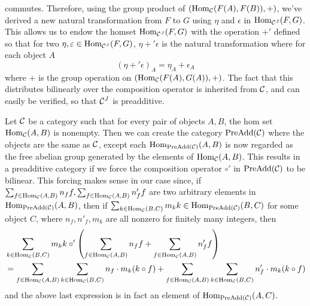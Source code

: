 \begin{example}
\begin{center}
    \end{center}
    commutes. Therefore, using the group product of $(\operatorname{\mathrm{Hom}}_{\mathcal{C}}(F(A), F(B)), +)$,
    we've derived a new natural transformation from $F$ to $G$ using $\eta$ and $\epsilon$ 
    in $\operatorname{\mathrm{Hom}}_{\mathcal{C}^J}(F, G)$. This allows us to endow the homset $\operatorname{\mathrm{Hom}}_{\mathcal{C}^J}(F, G)$ 
    with the operation $+'$  defined so that for two $\eta, \varepsilon \in \operatorname{\mathrm{Hom}}_{\mathcal{C}^J}(F, G)$,
    $\eta + ' \epsilon$ is the natural transformation where 
    for each object $A$
    \[
        (\eta +' \epsilon)_A = \eta_A + \epsilon_A
    \]
    where $+$ is the group operation on $(\operatorname{\mathrm{Hom}}_{\mathcal{C}}(F(A), G(A)), +)$. The fact that 
    this distributes bilinearly over the composition operator is inherited from 
    $\mathcal{C}$, and can easily be verified, so that $\mathcal{C}^J$ is preadditive.
\end{example}

\begin{example}
    Let $\mathcal{C}$ be a category such that for every pair of objects 
    $A, B$, the hom set $\operatorname{\mathrm{Hom}}_{\mathcal{C}}(A, B)$ is nonempty. Then we can create the category 
    $\text{PreAdd}(\mathcal{C})$ where the objects are the same as $\mathcal{C}$, except
    each $\operatorname{\mathrm{Hom}}_{\text{PreAdd}(\mathcal{C})}(A, B)$ is now regarded as the free 
    abelian group generated by the elements of $\operatorname{\mathrm{Hom}}_{\mathcal{C}}(A, B)$. This results 
    in a preadditive category if we force the composition operator $\circ'$
    in $\text{PreAdd}(\mathcal{C})$ to be bilinear. This forcing makes sense in our case since, 
    if $\sum_{f \in \operatorname{\mathrm{Hom}}_{\mathcal{C}}(A,B)}n_f f, \sum_{f \in \operatorname{\mathrm{Hom}}_{\mathcal{C}}(A,B)}n'_f f$ 
    are two arbitrary elements in $\operatorname{\mathrm{Hom}}_{\text{PreAdd}(\mathcal{C})}(A, B)$, 
    then if $\sum_{k \in \operatorname{\mathrm{Hom}}_{\mathcal{C}}(B,C)}m_k k \in \operatorname{\mathrm{Hom}}_{\text{PreAdd}(\mathcal{C})}(B, C)$ for some object $C$, 
    where  $n_f, n'_f, m_k$ are all nonzero for finitely many integers,
    then 
    \begin{align*}
        &\sum_{k \in \operatorname{\mathrm{Hom}}_{\mathcal{C}}(B,C)}m_k k \circ'
        \left( \sum_{f \in \operatorname{\mathrm{Hom}}_{\mathcal{C}}(A,B)}n_f f +
        \sum_{f \in \operatorname{\mathrm{Hom}}_{\mathcal{C}}(A,B)}n'_f f
        \right)\\
        &= 
        \sum_{f \in \operatorname{\mathrm{Hom}}_{\mathcal{C}}(A,B)}\sum_{k \in \operatorname{\mathrm{Hom}}_{\mathcal{C}}(B, C)}n_f \cdot m_k(k \circ f) 
        +
        \sum_{f \in \operatorname{\mathrm{Hom}}_{\mathcal{C}}(A,B)}\sum_{k \in \operatorname{\mathrm{Hom}}_{\mathcal{C}}(B, C)}n'_f \cdot m_k(k\circ f)
    \end{align*}
    and the above last expression is in fact an element of $\operatorname{\mathrm{Hom}}_{\text{PreAdd}(\mathcal{C})}(A, C)$. 
\end{example}



